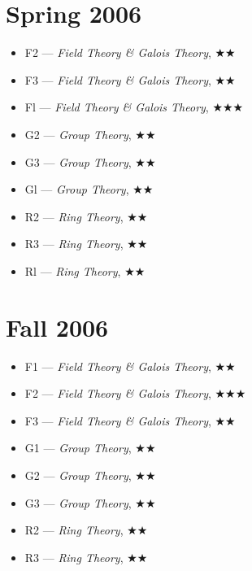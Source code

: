 \documentclass[11pt,letterpaper]{book}
\begin{document}
\section*{Spring 2006}
\begin{itemize}
\item F2 --- \textit{Field Theory \& Galois Theory}, $\bigstar\bigstar$
\item F3 --- \textit{Field Theory \& Galois Theory}, $\bigstar\bigstar$
\item Fl --- \textit{Field Theory \& Galois Theory}, $\bigstar\bigstar\bigstar$
\item G2 --- \textit{Group Theory}, $\bigstar\bigstar$
\item G3 --- \textit{Group Theory}, $\bigstar\bigstar$
\item Gl --- \textit{Group Theory}, $\bigstar\bigstar$
\item R2 --- \textit{Ring Theory}, $\bigstar\bigstar$
\item R3 --- \textit{Ring Theory}, $\bigstar\bigstar$
\item Rl --- \textit{Ring Theory}, $\bigstar\bigstar$
\end{itemize}

\section*{Fall 2006}
\begin{itemize}
\item F1 --- \textit{Field Theory \& Galois Theory}, $\bigstar\bigstar$
\item F2 --- \textit{Field Theory \& Galois Theory}, $\bigstar\bigstar\bigstar$
\item F3 --- \textit{Field Theory \& Galois Theory}, $\bigstar\bigstar$
\item G1 --- \textit{Group Theory}, $\bigstar\bigstar$
\item G2 --- \textit{Group Theory}, $\bigstar\bigstar$
\item G3 --- \textit{Group Theory}, $\bigstar\bigstar$
\item R2 --- \textit{Ring Theory}, $\bigstar\bigstar$
\item R3 --- \textit{Ring Theory}, $\bigstar\bigstar$
\end{itemize}
\end{document}
